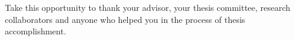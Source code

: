 \documentclass[12pt]{article}
\numberwithin{equation}{section} %
\begin{document}
Take this opportunity to thank your advisor, your thesis committee,
research collaborators and anyone who helped you in the process of
thesis accomplishment.




\newpage

\tableofcontents
%


\newpage
{}
\listoftables
\end{document}

